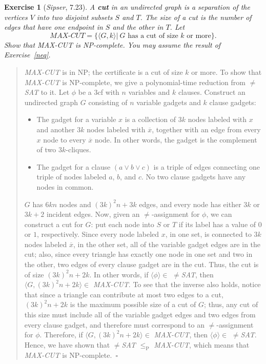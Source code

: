 \documentclass{article}
\theoremstyle{break}			%
\newtheorem{exercise}{Exercise}
\theoremstyle{plain}
\newenvironment{answer}{\begin{quotation}\noindent}{\end{quotation}}
\newcommand{\sipser}{\textit{Sipser}}
\newcommand{\encoding}[1]{\ensuremath{\langle#1\rangle}}
\renewcommand{\qed}{~\ensuremath{\square}}
\newcommand{\defin}[1]{\textbf{\textit{#1}}}
\newcommand{\setname}[1]{\textit{#1}}
\begin{document}
\begin{exercise}[\sipser, 7.23]
A \defin{cut} in an undirected graph is a separation of the vertices
$V$ into two disjoint subsets $S$ and $T$.  The size of a cut is the
number of edges that have one endpoint in $S$ and the other in $T$.
Let
\begin{displaymath}
\setname{MAX-CUT} = \{\encoding{G,k}|~G
\text{ has a cut of size $k$ or more}\}.
\end{displaymath}
Show that \setname{MAX-CUT} is NP-complete.  You may assume the result
of Exercise~\ref{neq}.
\end{exercise}
\begin{answer}
\setname{MAX-CUT} is in NP; the certificate is a cut of size $k$ or
more.  To show that \setname{MAX-CUT} is NP-complete, we give a
polynomial-time reduction from \setname{$\not=$SAT} to it.  Let $\phi$
be a 3cf with $n$ variables and $k$ clauses.  Construct an undirected
graph $G$ consisting of $n$ variable gadgets and $k$ clause gadgets:
\begin{itemize}
\item The gadget for a variable $x$ is a collection of $3k$ nodes
labeled with $x$ and another $3k$ nodes labeled with $\overline{x}$,
together with an edge from every $x$ node to every $\overline{x}$
node.  In other words, the gadget is the complement of two
$3k$-cliques.
\item The gadget for a clause $(a \vee b \vee c)$ is a triple of edges
connecting one triple of nodes labeled $a$, $b$, and $c$.  No two
clause gadgets have any nodes in common.
\end{itemize}
$G$ has $6kn$ nodes and $(3k)^2n + 3k$ edges, and every node has
either $3k$ or $3k+2$ incident edges.  Now, given an
$\not=$-assignment for $\phi$, we can construct a cut for $G$: put
each node into $S$ or $T$ if its label has a value of $0$ or $1$,
respectively.  Since every node labeled $x$, in one set, is connected
to $3k$ nodes labeled $\overline{x}$, in the other set, all of the
variable gadget edges are in the cut; also, since every triangle has
exactly one node in one set and two in the other, two edges of every
clause gadget are in the cut.  Thus, the cut is of size $(3k)^2n+2k$.
In other words, if $\encoding{\phi}\in$ \setname{$\not=$SAT}, then
$\encoding{G,(3k)^2n+2k}\in$ \setname{MAX-CUT}.  To see that the
inverse also holds, notice that since a triangle can contribute at
most two edges to a cut, $(3k)^2n+2k$ is the maximum possible size
of a cut of $G$; thus, any cut of this size must include all of the
variable gadget edges and two edges from every clause gadget, and
therefore must correspond to an $\not=$-assignment for $\phi$.
Therefore, if $\encoding{G,(3k)^2n+2k}\in$ \setname{MAX-CUT}, then
$\encoding{\phi}\in$ \setname{$\not=$SAT}.  Hence, we have shown that
$\not=$\setname{SAT} $\leq_{\text{P}}$ \setname{MAX-CUT}, which means
that \setname{MAX-CUT} is NP-complete.\qed
\end{answer}
\end{document}

